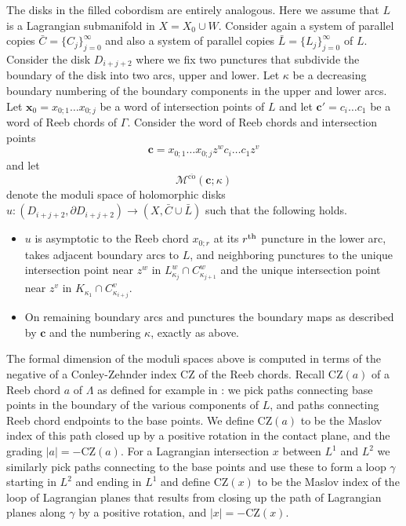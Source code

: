 \documentclass{gtpart}
\renewcommand{\co}{\mathrm{co}}
\begin{document}
The disks in the filled cobordism are entirely analogous. Here we assume that $L$ is a Lagrangian submanifold in $X=X_{0}\cup W$. Consider again a system of parallel copies $\bar C=\{C_{j}\}_{j=0}^{\infty}$ and also a system of parallel copies $\bar L=\{L_{j}\}_{j=0}^{\infty}$ of $L$. Consider the disk $D_{i+j+2}$ where we fix two punctures that subdivide the boundary of the disk into two arcs, upper and lower. Let $\kappa$ be a decreasing boundary numbering of the boundary components in the upper and lower arcs. Let $\mathbf{x}_{0}=x_{0;1}\dots x_{0;j}$ be a word of intersection points of $L$ and let $\mathbf{c}'=c_{i}\dots c_{1}$ be a word of Reeb chords of $\Gamma$. Consider the word of Reeb chords and intersection points 
\[ 
\mathbf{c}=x_{0;1}\dots x_{0;j}z^{w}c_{i}\dots c_{1}z^{v}
\]
and let 
\[ 
\mathcal{M}^{\overline{\co}}(\mathbf{c};\kappa)
\]
denote the moduli space of holomorphic disks $u\colon (D_{i+j+2},\partial D_{i+j+2})\to (X,\bar C\cup \bar L)$ such that the following holds.
\begin{itemize}
	\item $u$ is asymptotic to the Reeb chord $x_{0;r}$ at its $r^{\rm th}$ puncture in the lower arc, takes adjacent boundary arcs to $L$, and neighboring punctures to the unique intersection point near $z^{w}$ in $L_{\kappa_{j}}^{w}\cap C^{w}_{\kappa_{j+1}}$ and the unique intersection point near $z^{v}$ in $K_{\kappa_{1}}\cap C^{v}_{\kappa_{i+j}}$. 
	\item On remaining boundary arcs and punctures the boundary maps as described by $\mathbf{c}$ and the numbering $\kappa$, exactly as above.
\end{itemize}



The formal dimension of the moduli spaces above is computed in terms of the negative of a Conley-Zehnder index $\mathrm{CZ}$ of the Reeb chords. Recall $\mathrm{CZ}(a)$ of a Reeb chord $a$ of $\Lambda$ as defined for example in \cite[Section 2.1]{BEE}: we pick paths connecting base points in the boundary of the various components of $L$, and paths connecting Reeb chord endpoints to the base points. We define $\mathrm{CZ}(a)$ to be the Maslov index of this path closed up by a positive rotation in the contact plane, and the grading $|a|=-\mathrm{CZ}(a)$. For a Lagrangian intersection $x$ between $L^{1}$ and $L^{2}$ we similarly pick paths connecting to the base points and use these to form a loop $\gamma$ starting in $L^{2}$ and ending in $L^{1}$ and define $\mathrm{CZ}(x)$ to be the Maslov index of the loop of Lagrangian planes that results from closing up the path of Lagrangian planes along $\gamma$ by a positive rotation, and $|x|=-\mathrm{CZ}(x)$. 
\end{document}
